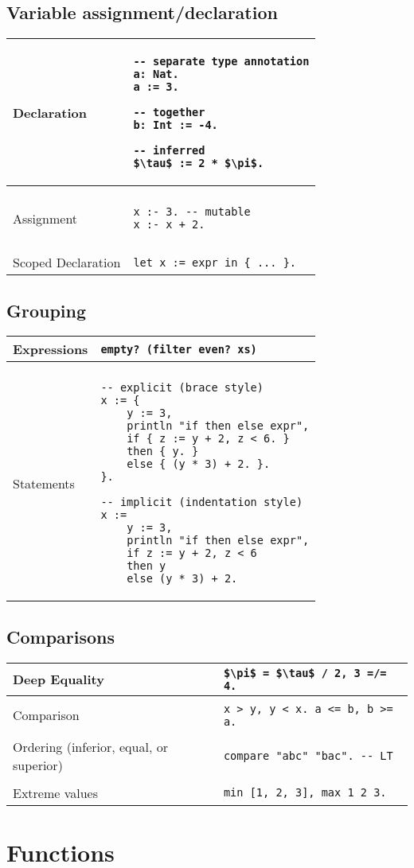 \documentclass[a4paper,12pt]{article}
\makeatletter
\newcommand{\code}{\lstinline}
\newcommand{\br}{\\ [0.5em] \hline \\ [-0.5em]}
\newenvironment{data}
    {
        \begin{center}
        \begin{tabular*}{\textwidth}{ l@{\extracolsep{\fill}}l }
    }
    {
        \end{tabular*}
        \end{center}
    }
\makeatother
\begin{document}
\subsection{Variable assignment/declaration}
    \begin{data}
        Declaration        & 
            \begin{lstlisting}[mathescape=true]
-- separate type annotation
a: Nat. 
a := 3.

-- together
b: Int := -4. 

-- inferred
$\tau$ := 2 * $\pi$. 
            \end{lstlisting} \br
        Assignment         & 
            \begin{lstlisting}
x :- 3. -- mutable
x :- x + 2. 
            \end{lstlisting} \br
        Scoped Declaration & 
            \code|let x := expr in { ... }.|
    \end{data}

\subsection{Grouping}
    \begin{data}
        Expressions       & 
            \code|empty? (filter even? xs)| \br
        Statements & 
            \begin{lstlisting}
-- explicit (brace style)
x := { 
    y := 3, 
    println "if then else expr",
    if { z := y + 2, z < 6. }
    then { y. } 
    else { (y * 3) + 2. }.
}.

-- implicit (indentation style)
x :=
    y := 3,
    println "if then else expr",
    if z := y + 2, z < 6 
    then y
    else (y * 3) + 2.
            \end{lstlisting}
    \end{data}

\subsection{Comparisons}
\begin{data}
    Deep Equality  & 
        \code[mathescape=true]
        |$\pi$ = $\tau$ / 2, 3 =/= 4.|       \br
    Comparison     &
        \code|x > y, y < x. a <= b, b >= a.| \br
    Ordering (inferior, equal, or superior) &
        \code|compare "abc" "bac". -- LT|    \br
    Extreme values &
        \code|min [1, 2, 3], max 1 2 3.|
\end{data}


\section{Functions}
\end{document}
